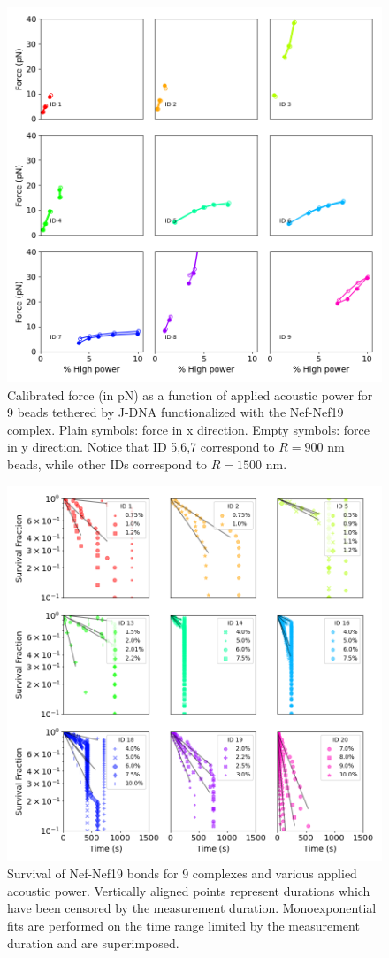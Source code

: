 \documentclass{biophys-new}
\begin{document}
\begin{figure}[hbt!]
	\centering
	\centerline {\includegraphics[width=0.75\linewidth]{Figures/Power_vs_Force_Bis_Nef.png}}
	\caption{Calibrated force (in pN) as a function of applied acoustic power for 9 beads tethered by J-DNA  functionalized with the Nef-Nef19 complex.  Plain symbols: force in x direction. Empty symbols: force in y direction. Notice that ID 5,6,7 correspond to $R= 900$ nm beads, while other IDs correspond to $R=1500$ nm.}
	\label{fig:PowerForce_Nef}	
\end{figure}

\begin{figure}[hbt!]
	\centering
	\centerline {\includegraphics[width=0.75\linewidth]{Figures/multisurvival2Bis_Nef.png}}
	\caption{Survival of Nef-Nef19 bonds for 9 complexes and various applied acoustic power. Vertically aligned points represent durations which have been censored by the measurement duration. Monoexponential fits are performed on the time range limited by the measurement duration and are superimposed.}
	\label{fig:MultiSurvival_Nef}	
\end{figure}
\end{document}

